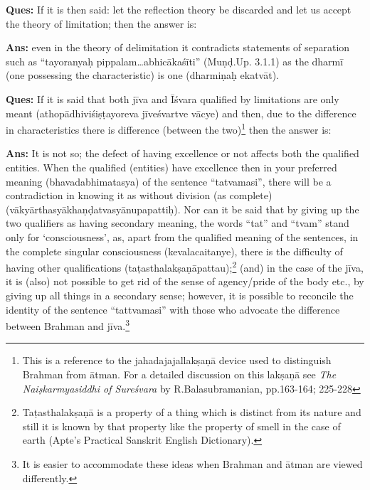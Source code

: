 

\textbf{Ques:} If it is then said: let the reflection theory be discarded and let us accept the theory of limitation; then the answer is: 

\textbf{Ans:} even in the theory of delimitation it contradicts statements of separation such as “tayoranyaḥ pippalam…abhicākaśīti” (Muṇḍ.Up. 3.1.1) as the dharmī (one possessing the characteristic) is one (dharmiṇaḥ ekatvāt). 

\textbf{Ques:} If it is said that both jīva and Īśvara qualified by limitations are only meant (athopādhiviśiṣṭayoreva jīveśvartve vācye)  and then, due to the difference in characteristics  there is difference (between the two)\footnote{This is a reference to the jahadajajallakṣaṇā device used to distinguish Brahman from ātman. For a detailed discussion on this lakṣaṇā see \textit{The Naiṣkarmyasiddhi of Sureśvara} by R.Balasubramanian, pp.163-164; 225-228} then the answer is:

\textbf{Ans:} It is not so; the defect of having excellence or not affects both the qualified entities.  When the qualified (entities) have excellence then in your preferred meaning (bhavadabhimatasya) of the sentence “tatvamasi”, there will be a contradiction in knowing it as without division (as complete) (vākyārthasyākhaṇḍatvasyānupapattiḥ). Nor can it be said that by giving up the two qualifiers as having secondary meaning, the words “tat” and “tvam” stand only for ‘consciousness’, as, apart from the qualified meaning of the sentences, in the complete singular consciousness (kevalacaitanye), there is the difficulty of having other qualifications (taṭasthalakṣaṇāpattau);\footnote{Taṭasthalakṣaṇā is a property of a thing which is distinct from its nature and still it is known by that property like the property of smell in the case of earth (Apte’s Practical Sanskrit English Dictionary).} (and) in the case of the jīva, it is (also) not possible to get rid of the sense of agency/pride of the body etc., by giving up all things in a secondary sense;  however, it is possible to reconcile the identity of the sentence “tattvamasi” with those who advocate the difference between Brahman and jīva.\footnote{It is easier to accommodate these ideas when Brahman and ātman are viewed differently.} 

